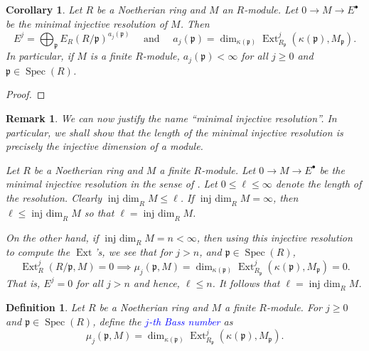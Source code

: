 \documentclass[10pt]{article}
\theoremstyle{thmstyle}
\theoremstyle{defstyle}
\newtheorem{definition}[theorem]{Definition}
\newtheorem{corollary}[theorem]{Corollary}
\newtheorem{remark}[theorem]{Remark}
\newcommand{\Spec}{\operatorname{Spec}}
\newcommand{\frakp}{\mathfrak{p}} %
\newcommand{\define}[1]{\textcolor{blue}{\textit{#1}}}
\renewcommand{\le}{\leqslant}
\renewcommand{\ge}{\geqslant}
\newcommand{\Ext}{\operatorname{Ext}}
\newcommand{\injdim}{\operatorname{inj~dim}}
\begin{document}
\begin{corollary}
    Let $R$ be a Noetherian ring and $M$ an $R$-module. Let $0\to M\to E^\bullet$ be \emph{the} minimal injective resolution of $M$. Then 
    \begin{equation*}
        E^j = \bigoplus_{\frakp}E_R\left(R/\frakp\right)^{a_j(\frakp)}\quad\text{ and }\quad a_j(\frakp) = \dim_{\kappa(\frakp)} \Ext^j_{R_\frakp}\left(\kappa(\frakp), M_\frakp\right).
    \end{equation*}
    In particular, if $M$ is a finite $R$-module, $a_j(\frakp) < \infty$ for all $j\ge 0$ and $\frakp\in\Spec(R)$.
\end{corollary}
\begin{proof}
\end{proof}

\begin{remark}
    We can now justify the name ``minimal injective resolution''. In particular, we shall show that the length of the minimal injective resolution is precisely the injective dimension of a module. 
    
    Let $R$ be a Noetherian ring and $M$ a finite $R$-module. Let $0\to M\to E^\bullet$ be \emph{the} minimal injective resolution in the sense of . Let $0\le\ell\le\infty$ denote the length of the resolution. Clearly $\injdim_R M\le\ell$. If $\injdim_R M = \infty$, then $\ell\le\injdim_R M$ so that $\ell = \injdim_R M$. 

    On the other hand, if $\injdim_R M = n < \infty$, then using this injective resolution to compute the $\Ext$'s, we see that for $j > n$, and $\frakp\in\Spec(R)$, 
    \begin{equation*}
        \Ext^{j}_R(R/\frakp, M) = 0\implies\mu_j(\frakp, M) = \dim_{\kappa(\frakp)}\Ext^{j}_{R_\frakp}\left(\kappa(\frakp), M_\frakp\right) = 0.
    \end{equation*}
    That is, $E^j = 0$ for all $j > n$ and hence, $\ell\le n$. It follows that $\ell = \injdim_R M$.
\end{remark}

\begin{definition}
    Let $R$ be a Noetherian ring and $M$ a finite $R$-module. For $j\ge 0$ and $\frakp\in\Spec(R)$, define the \define{$j$-th Bass number} as 
    \begin{equation*}
        \mu_j\left(\frakp, M\right) = \dim_{\kappa(\frakp)}\Ext_{R_\frakp}^j\left(\kappa(\frakp), M_\frakp\right).
    \end{equation*}
\end{definition}
\end{document}
